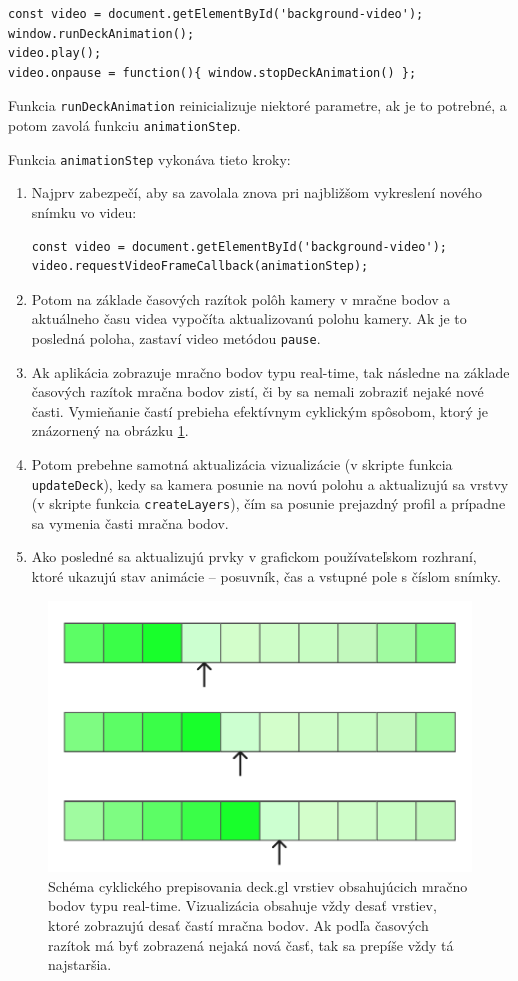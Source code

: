 \begin{lstlisting}
const video = document.getElementById('background-video');
window.runDeckAnimation();
video.play();
video.onpause = function(){ window.stopDeckAnimation() };
\end{lstlisting}

Funkcia \texttt{runDeckAnimation} reinicializuje niektoré parametre, ak je to potrebné, a potom zavolá funkciu \texttt{animationStep}.

Funkcia \texttt{animationStep} vykonáva tieto kroky:

\begin{enumerate}
    \item Najprv zabezpečí, aby sa zavolala znova pri najbližšom vykreslení nového snímku vo videu:
    \begin{lstlisting}
const video = document.getElementById('background-video');
video.requestVideoFrameCallback(animationStep);
    \end{lstlisting}

    \item Potom na základe časových razítok polôh kamery v mračne bodov a aktuálneho času videa vypočíta aktualizovanú polohu kamery. Ak je to posledná poloha, zastaví video metódou \texttt{pause}.

    \item Ak aplikácia zobrazuje mračno bodov typu real-time, tak následne na základe časových razítok mračna bodov zistí, či by sa nemali zobraziť nejaké nové časti. Vymieňanie častí prebieha efektívnym cyklickým spôsobom, ktorý je znázornený na obrázku \ref{fig:vrstvy_animacia}.

    \item Potom prebehne samotná aktualizácia vizualizácie (v skripte funkcia \texttt{updateDeck}), kedy sa kamera posunie na novú polohu a aktualizujú sa vrstvy (v skripte funkcia \texttt{createLayers}), čím sa posunie prejazdný profil a prípadne sa vymenia časti mračna bodov.

    \item Ako posledné sa aktualizujú prvky v grafickom používateľskom rozhraní, ktoré ukazujú stav animácie -- posuvník, čas a vstupné pole s číslom snímky.
\end{enumerate}

\begin{figure}[h]
    \centering
    \includegraphics[width=0.4\linewidth]{text_prace/obrazky-figures/vrstvy_animacia.pdf}
    \caption{Schéma cyklického prepisovania deck.gl vrstiev obsahujúcich mračno bodov typu real-time. Vizualizácia obsahuje vždy desať vrstiev, ktoré zobrazujú desať častí mračna bodov. Ak podľa časových razítok má byť zobrazená nejaká nová časť, tak sa prepíše vždy tá najstaršia.}
    \label{fig:vrstvy_animacia}
\end{figure}

